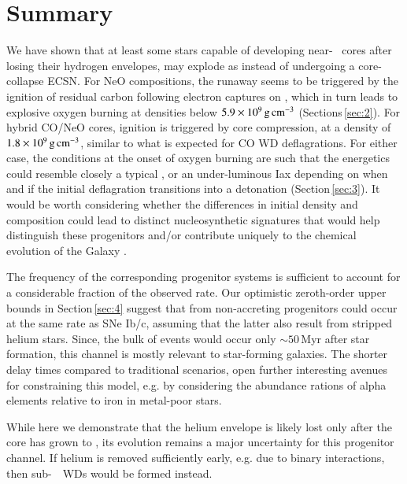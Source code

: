 \documentclass[twocolumn]{aa}
\begin{document}
\section{Summary}\label{sec:5}
We have shown that at least some stars capable of developing near-\mch~ \one cores 
after losing their hydrogen  envelopes, may explode as \ias instead of 
undergoing a core-collapse  ECSN. For NeO compositions, the runaway seems to be triggered by the ignition of 
residual carbon following electron captures on , which in turn 
leads to explosive oxygen burning at densities below $5.9\times 10^{9}\mathrm{\,g\,cm^{-3}}$ (Sections\,\ref{sec:2}). 
For hybrid CO/NeO cores, ignition is triggered by core compression, at a density of $1.8\times10^{9}\mathrm{\,g\,cm^{-3}}$, similar to what is expected for CO WD deflagrations. For either case, the conditions at the onset of oxygen burning are such that the energetics  could resemble closely a typical \ia, or an under-luminous Iax depending on when and if the initial deflagration transitions into a detonation (Section\,\ref{sec:3}). 
It would be worth considering whether the differences in initial density and 
composition could lead to distinct nucleosynthetic signatures that would help 
distinguish these progenitors and/or contribute uniquely to the chemical 
evolution of the Galaxy \citep[in analogy to ][for ECSNe]{Jones:2018ule}.



The frequency of the corresponding progenitor systems 
is sufficient to account for a considerable fraction of the observed \ia  rate.  Our optimistic zeroth-order upper bounds in  Section\,\ref{sec:4} suggest that \ias from non-accreting progenitors could occur at the same rate as SNe Ib/c, assuming that the latter also result from stripped helium stars. Since, the bulk of events would occur only $\sim 50$\,Myr after star formation, this channel is mostly relevant to star-forming galaxies. The shorter delay times compared to traditional \ia scenarios, open further interesting avenues for constraining this model, e.g.  by considering the abundance rations of alpha elements relative to iron in metal-poor stars. 

 While here we demonstrate that the helium envelope is  likely lost only  after the core has grown to \mch, its evolution remains a major uncertainty for this progenitor channel. If helium is removed sufficiently early, e.g. due to binary interactions, then sub-\mch~\one\ WDs would be formed instead. 
 
\end{document}
